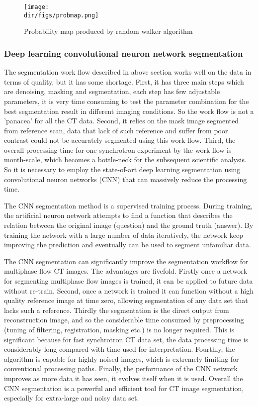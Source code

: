 \begin{figure}[htbp]
  \centering
  \texttt{[image: \\dir/figs/probmap.png]}
  \caption{Probability map produced by random walker algorithm}
  \label{probmap}
\end{figure}

\subsubsection{Deep learning convolutional neuron network segmentation}
The segmentation work flow described in above section works well on the data in terms of quality, but it has some shortage. First, it has three main steps which are denoising, masking and segmentation, each step has few adjustable parameters, it is very time consuming to test the parameter combination for the best segmentation result in different imaging conditions. So the work flow is not a 'panacea' for all the CT data. Second, it relies on the mask image segmented from reference scan, data that lack of such reference and suffer from poor contrast could not be accurately segmented using this work flow. Third, the overall processing time for one synchrotron experiment by the work flow is month-scale, which becomes a bottle-neck for the subsequent scientific analysis. So it is necessary to employ the state-of-art deep learning segmentation using convolutional neuron networks (CNN) that can massively reduce the processing time.

The CNN segmentation method is a supervised training process. During training, the artificial neuron network attempts to find a function that describes the relation between the original image (question) and the ground truth (answer). By training the network with a large number of data iteratively, the network keep improving the prediction and eventually can be used to segment unfamiliar data.

The CNN segmentation can significantly improve the segmentation workflow for multiphase flow \textmu CT images. The advantages are fivefold. Firstly once a network for segmenting multiphase flow images is trained, it can be applied to future data without re-train. Second, once a network is trained it can function without a high quality reference image at time zero, allowing segmentation of any data set that lacks such a reference. Thirdly the segmentation is the direct output from reconstruction image, and so the considerable time consumed by preprocessing (tuning of filtering, registration, masking etc.) is no longer required. This is significant because for fast synchrotron \textmu CT data set, the data processing time is considerably long compared with time used for interpretation. Fourthly, the algorithm is capable for highly noised images, which is extremely limiting for conventional processing paths. Finally, the performance of the CNN network improves as more data it has seen, it evolves itself when it is used. Overall the CNN segmentation is a powerful and efficient tool for \textmu CT image segmentation, especially for extra-large and noisy data set.

